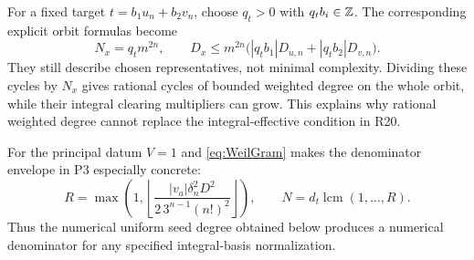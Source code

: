 For a fixed target $t=b_1u_n+b_2v_n$, choose $q_t>0$ with $q_tb_i\in\mathbb Z$. The corresponding explicit orbit formulas become
\[
 N_x=q_tm^{2n},\qquad
 D_x\le m^{2n}\bigl(|q_tb_1|D_{u,n}+|q_tb_2|D_{v,n}\bigr).
\]
They still describe chosen representatives, not minimal complexity. Dividing these cycles by $N_x$ gives rational cycles of bounded weighted degree on the whole orbit, while their integral clearing multipliers can grow. This explains why rational weighted degree cannot replace the integral-effective condition in R20.

For the principal datum $V=1$ and \eqref{eq:WeilGram} makes the denominator envelope in P3 especially concrete:
\[
 R=\max\left(1,\left\lfloor
 \frac{|v_a|\delta_n^2D^2}{2\,3^{n-1}(n!)^2}
 \right\rfloor\right),\qquad
 N=d_t\operatorname{lcm}(1,\ldots,R).
\]
Thus the numerical uniform seed degree obtained below produces a numerical denominator for any specified integral-basis normalization.

